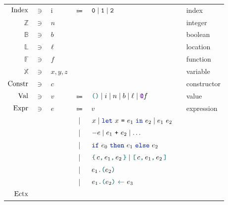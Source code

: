 \begin{figure}[tp]
    \begin{tabular}{rclclcl}
            $\mathrm{Index}$
            & $\ni$ &
            i
            & $\Coloneqq$ &
            $\texttt{0} \mid \texttt{1} \mid \texttt{2}$
            &&
            index
        \\
            $\mathbb{Z}$
            & $\ni$ &
            $n$
            &&
            &&
            integer
        \\
            $\mathbb{B}$
            & $\ni$ &
            $b$
            &&
            &&
            boolean
    	\\
    		$\mathbb{L}$
    		& $\ni$ &
    		$\ell$
    		&&
    		&&
    		location
        \\
            $\mathbb{F}$
            & $\ni$ &
            $f$
            &&
            &&
            function
        \\
            $\mathbb{X}$
            & $\ni$ &
            $x, y, z$
            &&
            &&
            variable
        \\
            $\mathrm{Constr}$
            & $\ni$ &
            $c$
            &&
            &&
            constructor
    	\\
            $\mathrm{Val}$
            & $\ni$ &
            $v$
            & $\Coloneqq$ &
            $\lambdUnit \mid i \mid n \mid b \mid \ell \mid \lambdFunc{f}$
            &&
            value
        \\
            $\mathrm{Expr}$
            & $\ni$ &
            $e$
            & $\Coloneqq$ &
            $v$
            &&
            expression
        \\
            &&
            & | &
            $x \mid \lambdLet{x}{e_1}{e_2} \mid \lambdCall{e_1}{e_2}$
        \\
            &&
            & | &
            $- e \mid e_1\ \texttt{+}\ e_2 \mid \dots$
        \\
            &&
            & | &
            $\lambdIf{e_0}{e_1}{e_2}$
        \\
            &&
            & | &
            $\lambdConstr{c}{e_1}{e_2} \mid \lambdConstrDet{c}{e_1}{e_2}$
        \\
            &&
            & | &
            $\lambdLoad{e_1}{e_2}$
        \\
            &&
            & | &
            $\lambdStore{e_1}{e_2}{e_3}$
        \\
            $\mathrm{Ectx}$

\end{tabular}
\end{figure}
